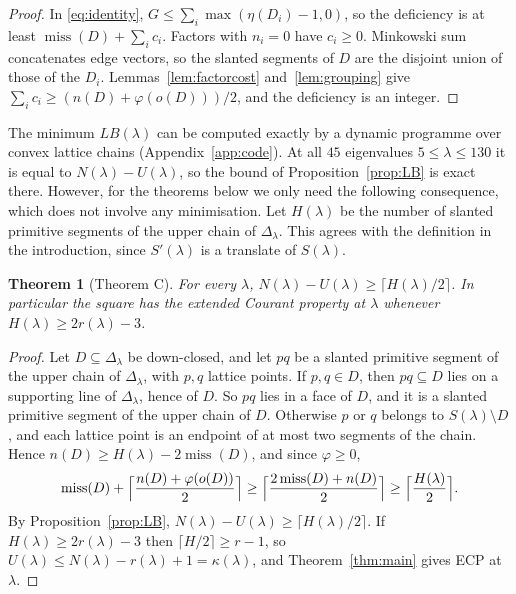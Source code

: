 \documentclass[11pt]{amsart}
\newtheorem{theorem}{Theorem}[section]
\theoremstyle{definition}
\theoremstyle{remark}
\newcommand{\miss}{\operatorname{miss}}
\numberwithin{equation}{section}
\begin{document}
\begin{proof}
In \eqref{eq:identity}, $G\le\sum_i\max(\eta(D_i)-1,0)$, so the deficiency is at least
$\miss(D)+\sum_ic_i$. Factors with $n_i=0$ have $c_i\ge0$. Minkowski sum concatenates edge
vectors, so the slanted segments of $D$ are the disjoint union of those of the $D_i$.
Lemmas~\ref{lem:factorcost} and~\ref{lem:grouping} give $\sum_ic_i\ge(n(D)+\varphi(o(D)))/2$,
and the deficiency is an integer.
\end{proof}

The minimum $LB(\lambda)$ can be computed exactly by a dynamic programme over convex
lattice chains (Appendix~\ref{app:code}). At all $45$ eigenvalues $5\le\lambda\le130$ it is equal
to $N(\lambda)-U(\lambda)$, so the bound of Proposition~\ref{prop:LB} is exact there. However,
for the theorems below we only need the following consequence, which does not involve any
minimisation. Let $H(\lambda)$ be the number of slanted primitive segments of the upper chain
of $\Delta_\lambda$. This agrees with the definition in the introduction, since $S'(\lambda)$
is a translate of $S(\lambda)$.

\begin{theorem}[Theorem C]\label{thm:hull}
For every $\lambda$, $N(\lambda)-U(\lambda)\ge\lceil H(\lambda)/2\rceil$. In particular the
square has the extended Courant property at $\lambda$ whenever $H(\lambda)\ge2r(\lambda)-3$.
\end{theorem}

\begin{proof}
Let $D\subseteq\Delta_\lambda$ be down-closed, and let $pq$ be a slanted primitive segment of
the upper chain of $\Delta_\lambda$, with $p,q$ lattice points. If $p,q\in D$, then $pq\subseteq D$
lies on a supporting line of $\Delta_\lambda$, hence of $D$. So $pq$ lies in a face of $D$,
and it is a slanted primitive segment of the upper chain of $D$. Otherwise $p$ or $q$ belongs to
$S(\lambda)\setminus D$, and each lattice point is an endpoint of at most two segments of the
chain. Hence $n(D)\ge H(\lambda)-2\miss(D)$, and since $\varphi\ge0$,
\[
\miss(D)+\Bigl\lceil\frac{n(D)+\varphi(o(D))}{2}\Bigr\rceil
\ge\Bigl\lceil\frac{2\miss(D)+n(D)}{2}\Bigr\rceil\ge\Bigl\lceil\frac{H(\lambda)}{2}\Bigr\rceil.
\]
By Proposition~\ref{prop:LB}, $N(\lambda)-U(\lambda)\ge\lceil H(\lambda)/2\rceil$. If
$H(\lambda)\ge2r(\lambda)-3$ then $\lceil H/2\rceil\ge r-1$, so
$U(\lambda)\le N(\lambda)-r(\lambda)+1=\kappa(\lambda)$, and Theorem~\ref{thm:main} gives ECP at
$\lambda$.
\end{proof}
\end{document}
